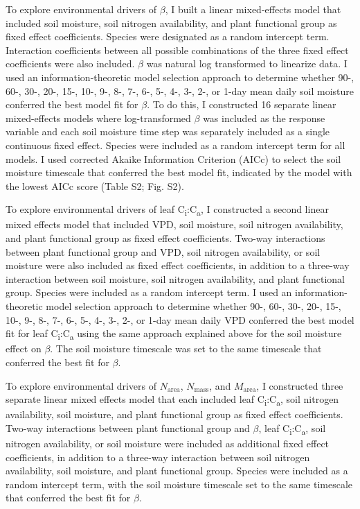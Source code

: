 To explore environmental drivers of $\beta$, I built a linear mixed-effects model that included soil moisture, soil nitrogen availability, and plant functional group as fixed effect coefficients. Species were designated as a random intercept term. Interaction coefficients between all possible combinations of the three fixed effect coefficients were also included. $\beta$ was natural log transformed to linearize data. I used an information-theoretic model selection approach to determine whether 90-, 60-, 30-, 20-, 15-, 10-, 9-, 8-, 7-, 6-, 5-, 4-, 3-, 2-, or 1-day mean daily soil moisture conferred the best model fit for $\beta$. To do this, I constructed 16 separate linear mixed-effects models where log-transformed $\beta$ was included as the response variable and each soil moisture time step was separately included as a single continuous fixed effect. Species were included as a random intercept term for all models. I used corrected Akaike Information Criterion (AICc) to select the soil moisture timescale that conferred the best model fit, indicated by the model with the lowest AICc score (Table S2; Fig. S2).

To explore environmental drivers of leaf C\textsubscript{i}:C\textsubscript{a}, I constructed a second linear mixed effects model that included VPD, soil moisture, soil nitrogen availability, and plant functional group as fixed effect coefficients. Two-way interactions between plant functional group and VPD, soil nitrogen availability, or soil moisture were also included as fixed effect coefficients, in addition to a three-way interaction between soil moisture, soil nitrogen availability, and plant functional group. Species were included as a random intercept term. I used an information-theoretic model selection approach to determine whether 90-, 60-, 30-, 20-, 15-, 10-, 9-, 8-, 7-, 6-, 5-, 4-, 3-, 2-, or 1-day mean daily VPD conferred the best model fit for leaf C\textsubscript{i}:C\textsubscript{a} using the same approach explained above for the soil moisture effect on $\beta$. The soil moisture timescale was set to the same timescale that conferred the best fit for $\beta$.

To explore environmental drivers of $N_\mathrm{area}$, $N_\mathrm{mass}$, and $M_\mathrm{area}$, I constructed three separate linear mixed effects model that each included leaf C\textsubscript{i}:C\textsubscript{a}, soil nitrogen availability, soil moisture, and plant functional group as fixed effect coefficients. Two-way interactions between plant functional group and $\beta$, leaf C\textsubscript{i}:C\textsubscript{a}, soil nitrogen availability, or soil moisture were included as additional fixed effect coefficients, in addition to a three-way interaction between soil nitrogen availability, soil moisture, and plant functional group. Species were included as a random intercept term, with the soil moisture timescale set to the same timescale that conferred the best fit for $\beta$.

